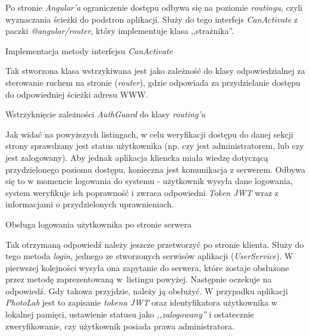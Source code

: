 \noindent Po stronie \textit{Angular'a} ograniczenie dostępu odbywa się na poziomie \textit{routingu}, czyli wyznaczania ścieżki do podstron aplikacji. Służy do tego interfejs \textit{CanActivate} z paczki \textit{@angular/router}, który implementuje klasa ,,strażnika''.
	
\begin{listing}[ht]
    \caption{Implementacja metody interfejsu \textit{CanActivate}}
    \label{listing:can-activate-interface}
\end{listing}

\noindent Tak stworzona klasa wstrzykiwana jest jako zależność do klasy odpowiedzialnej za sterowanie ruchem na stronie (\textit{router}), gdzie odpowiada za przydzielanie dostępu do odpowiedniej ścieżki adresu WWW.

\begin{listing}[ht]
    \caption{Wstrzyknięcie zależności \textit{AuthGuard} do klasy \textit{routing'u}}
    \label{listing:injection-auth-guard}
\end{listing}

\noindent Jak widać na powyższych listingach, w celu weryfikacji dostępu do danej sekcji strony sprawdzany jest status użytkownika (np. czy jest administratorem, lub czy jest zalogowany). Aby jednak aplikacja kliencka miała wiedzę dotyczącą przydzielonego poziomu dostępu, konieczna jest komunikacja z serwerem. Odbywa się to w momencie logowania do systemu - użytkownik wysyła dane logowania, system weryfikuje ich poprawność i zwraca odpowiedni \textit{Token JWT} wraz z informacjami o przydzielonych uprawnieniach.

\begin{listing}[ht]
    \caption{Obsługa logowania użytkownika po stronie serwera}
    \label{listing:login-server}
\end{listing}

\noindent Tak otrzymaną odpowiedź należy jeszcze przetworzyć po stronie klienta. Służy do tego metoda \textit{login}, jednego ze stworzonych serwisów aplikacji (\textit{UserService}). W pierwszej kolejności wysyła ona zapytanie do serwera, które zostaje obsłużone przez metodę zaprezentowaną w~listingu powyżej. Następnie oczekuje na odpowiedź. Gdy takowa przyjdzie, należy ją obsłużyć. W przypadku aplikacji \textit{PhotoLab} jest to zapisanie \textit{tokena JWT} oraz identyfikatora użytkownika w lokalnej pamięci, ustawienie statusu jako \textit{,,zalogowany''} i ostatecznie zweryfikowanie, czy użytkownik posiada prawa administratora. 
\newpage
    

